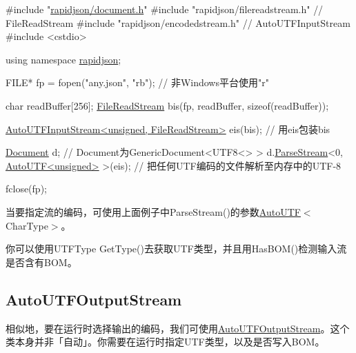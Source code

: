 \begin{DoxyCode}
\textcolor{preprocessor}{#include "\hyperlink{document_8h}{rapidjson/document.h}"}
\textcolor{preprocessor}{#include "rapidjson/filereadstream.h"}   \textcolor{comment}{// FileReadStream}
\textcolor{preprocessor}{#include "rapidjson/encodedstream.h"}    \textcolor{comment}{// AutoUTFInputStream}
\textcolor{preprocessor}{#include <cstdio>}

\textcolor{keyword}{using namespace }\hyperlink{namespacerapidjson}{rapidjson};

FILE* fp = fopen(\textcolor{stringliteral}{"any.json"}, \textcolor{stringliteral}{"rb"}); \textcolor{comment}{// 非Windows平台使用"r"}

\textcolor{keywordtype}{char} readBuffer[256];
\hyperlink{class_file_read_stream}{FileReadStream} bis(fp, readBuffer, \textcolor{keyword}{sizeof}(readBuffer));

\hyperlink{class_auto_u_t_f_input_stream}{AutoUTFInputStream<unsigned, FileReadStream>} eis(bis);  \textcolor{comment}{//
       用eis包装bis}

\hyperlink{class_generic_document}{Document} d;         \textcolor{comment}{// Document为GenericDocument<UTF8<> > }
d.\hyperlink{class_generic_document_afe94c0abc83a20f2d7dc1ba7677e6238}{ParseStream}<0, \hyperlink{struct_auto_u_t_f}{AutoUTF<unsigned>} >(eis); \textcolor{comment}{// 把任何UTF编码的文件解析至内存中的UTF-8}

fclose(fp);
\end{DoxyCode}


当要指定流的编码，可使用上面例子中{\ttfamily Parse\+Stream()}的参数{\ttfamily \hyperlink{struct_auto_u_t_f}{Auto\+U\+TF}$<$Char\+Type$>$}。

你可以使用{\ttfamily U\+T\+F\+Type Get\+Type()}去获取\+U\+T\+F类型，并且用{\ttfamily Has\+B\+O\+M()}检测输入流是否含有\+B\+O\+M。\hypertarget{md_Commun_Externe_RapidJSON_doc_stream.zh-cn_AutoUTFOutputStream}{}\subsection{Auto\+U\+T\+F\+Output\+Stream}\label{md_Commun_Externe_RapidJSON_doc_stream.zh-cn_AutoUTFOutputStream}
相似地，要在运行时选择输出的编码，我们可使用{\ttfamily \hyperlink{class_auto_u_t_f_output_stream}{Auto\+U\+T\+F\+Output\+Stream}}。这个类本身并非「自动」。你需要在运行时指定\+U\+T\+F类型，以及是否写入\+B\+O\+M。


